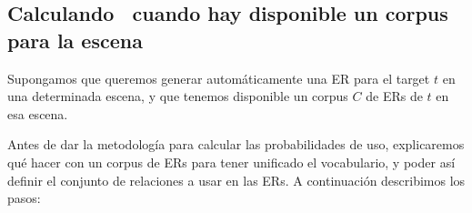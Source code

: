 
\subsection{Calculando \puse\ cuando hay disponible un corpus para la escena}
\label{sec:learning-corpus}

Supongamos que queremos generar autom\'aticamente una ER para el target $t$ en una
determinada escena, y que tenemos disponible un corpus $C$ de ERs de $t$
en esa escena.




Antes de dar la metodolog\'ia para calcular las probabilidades de uso, explicaremos qu\'e hacer con un corpus de ERs para tener unificado el vocabulario, y poder as\'i definir el conjunto de relaciones a usar en las ERs. A continuaci\'on describimos los pasos:

